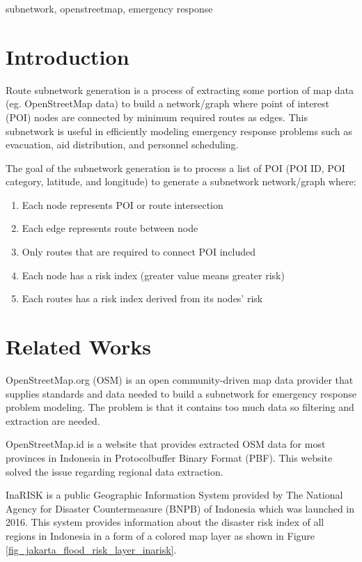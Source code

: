 \documentclass[conference]{IEEEtran}
\begin{document}
\begin{IEEEkeywords}
subnetwork, openstreetmap, emergency response
\end{IEEEkeywords}

\section{Introduction}

Route subnetwork generation is a process of extracting some portion of map data (eg. OpenStreetMap data) to build a network/graph where point of interest (POI) nodes are connected by minimum required routes as edges. This subnetwork is useful in efficiently modeling emergency response problems such as evacuation, aid distribution, and personnel scheduling.

The goal of the subnetwork generation is to process a list of POI (POI ID, POI category, latitude, and longitude) to generate a subnetwork network/graph where:

\begin{enumerate}
\item Each node represents POI or route intersection
\item Each edge represents route between node
\item Only routes that are required to connect POI included
\item Each node has a risk index (greater value means greater risk)
\item Each routes has a risk index derived from its nodes' risk
\end{enumerate} 

\section{Related Works}

OpenStreetMap.org (OSM) \cite{haklay2008openstreetmap} is an open community-driven map data provider that supplies standards and data needed to build a subnetwork for emergency response problem modeling. The problem is that it contains too much data so filtering and extraction are needed. 

OpenStreetMap.id is a website that provides extracted OSM data for most provinces in Indonesia in Protocolbuffer Binary Format (PBF). This website solved the issue regarding regional data extraction. 

InaRISK\cite{Bnpb2016Inarisk} is a public Geographic Information System provided by The National Agency for Disaster Countermeasure (BNPB) of Indonesia which was launched in 2016. This system provides information about the disaster risk index of all regions in Indonesia in a form of a colored map layer as shown in Figure \ref{fig_jakarta_flood_risk_layer_inarisk}.
\end{document}

